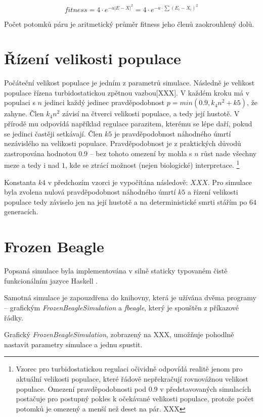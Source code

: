 $$fitness = 4{\cdot}e^{-a |E-X|^2} = 4{\cdot}e^{-a\cdot{\sum{(E_i - X_i)^2}}}$$

Počet potomků páru je aritmetický průměr fitness jeho členů zaokrouhlený dolů.


\section{Řízení velikosti populace}

Počáteční velikost populace je jedním z parametrů simulace. Následně je velikost populace řízena turbidostatickou zpětnou vazbou[XXX]. V každém kroku má v populaci s $n$ jedinci každý jedinec pravděpodobnost $p = min(0.9, k_4 n^2 + k5)$, že zahyne. Člen $k_4 n^2$ závisí na čtverci velikosti populace, a tedy její hustotě. V přírodě mu odpovídá například regulace parazitem, kterému se lépe daří, pokud se jedinci častěji setkávají. Člen $k5$ je pravděpodobnost náhodného úmrtí nezávislého na velikosti populace. Pravděpodobnost je z praktických důvodů zastropována hodnotou 0.9 -- bez tohoto omezení by mohla s $n$ růst nade všechny meze a tedy i nad $1$, kde se ztrácí možnost (nejen biologické) interpretace.
\footnote{Vzorec pro turbidostatickou regulaci očividně odpovídá realitě jenom pro aktuální velikosti populace, které řádově nepřekračují rovnovážnou velikost populace. Omezení pravděpodobnosti pod $0.9$ v představovaných simulacích postačuje pro postupný pokles k očekávané velikosti populace, protože počet potomků je omezený a menší než deset na pár. XXX}

Konstanta $k4$ v předchozím vzorci je vypočítána následově: $XXX$. Pro simulace byla zvolena nulová pravděpodobnost náhodného úmrtí $k5$ a řízení velikosti populace tedy záviselo jen na její hustotě a na deterministické smrti stářím po $64$ generacích.


\section{Frozen Beagle}

Popsaná simulace byla implementována v silně staticky typovaném čistě funkcionálním jazyce Haskell \cite{Haskell}.

Samotná simulace je zapouzdřena do knihovny, která je užívána dvěma programy -- grafickým \textit{FrozenBeagleSimulation} a \textit{fbeagle}, který je spouštěn z příkazové řádky.

Grafický \textit{FrozenBeagleSimulation}, zobrazený na XXX, umožňuje pohodlně nastavit parametry simulace a jednu spustit.

